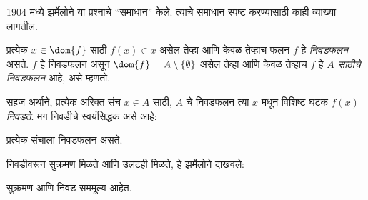 1904 मध्ये झर्मेलोने या प्रश्नाचे “समाधान” केले. त्याचे समाधान स्पष्ट करण्यासाठी काही व्याख्या लागतील.

\begin{defn}
प्रत्येक $x \in \dom{f}$ साठी $f(x) \in x$ असेल तेव्हा आणि केवळ तेव्हाच फलन $f$ हे \emph{निवडफलन} असते. $f$ हे निवडफलन असून $\dom{f} = A \setminus \{\emptyset\}$ असेल तेव्हा आणि केवळ तेव्हाच $f$ हे \emph{$A$ साठीचे निवडफलन} आहे, असे म्हणतो.
\end{defn}

सहज अर्थाने, प्रत्येक अरिक्त संच $x \in A$ साठी, $A$ चे निवडफलन त्या $x$ मधून विशिष्ट घटक $f(x)$ \emph{निवडते}. मग निवडीचे स्वयंसिद्धक असे आहे:

\begin{axiom}[निवड]
	प्रत्येक संचाला निवडफलन असते.
\end{axiom}

निवडीवरून सुक्रमण मिळते आणि उलटही मिळते, हे झर्मेलोने दाखवले:

\begin{thm}[$\ZF$ मध्ये]\label{sth:choice:woproblem:thmwochoice}
सुक्रमण आणि निवड सममूल्य आहेत.
\end{thm}

